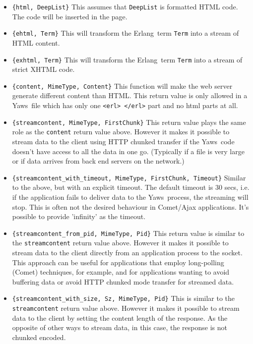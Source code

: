 \documentclass[11pt,oneside,english]{book}
\newcommand{\Erlang}            %
        {{\sc Erlang}}
\newcommand{\Yaws}            %
        {{\sc Yaws}}
\begin{document}
\begin{itemize}


\item \verb+{html, DeepList}+ This assumes that \verb+DeepList+ is
  formatted HTML code.  The code will be inserted in the page.

\item \verb+{ehtml, Term}+ This will transform the \Erlang\ term
  \verb+Term+ into a stream of HTML content.

\item \verb+{exhtml, Term}+ This will transform the \Erlang\ term
  \verb+Term+ into a stream of strict XHTML code.

\item \verb+{content, MimeType, Content}+ This function will make the
  web server generate different content than HTML. This return value
  is only allowed in a \Yaws\ file which has only one
  \verb+<erl> </erl>+ part and no html parts at all.

\item \verb+{streamcontent, MimeType, FirstChunk}+ This return value
  plays the same role as the \verb+content+ return value above.
  However it makes it possible to stream data to the client using HTTP
  chunked transfer if the \Yaws\ code doesn't have access to all the
  data in one go. (Typically if a file is very large or if data
  arrives from back end servers on the network.)

\item
  \verb+{streamcontent_with_timeout, MimeType, FirstChunk, Timeout}+
  Similar to the above, but with an explicit timeout. The default
  timeout is 30 secs, i.e. if the application fails to deliver data to
  the \Yaws\ process, the streaming will stop. This is often not the
  desired behaviour in Comet/Ajax applications. It's possible to
  provide 'infinity' as the timeout.

\item \verb+{streamcontent_from_pid, MimeType, Pid}+ This return value
  is similar to the \verb+streamcontent+ return value above.  However
  it makes it possible to stream data to the client directly from an
  application process to the socket. This approach can be useful for
  applications that employ long-polling (Comet) techniques, for
  example, and for applications wanting to avoid buffering data or
  avoid HTTP chunked mode transfer for streamed data.

\item \verb+{streamcontent_with_size, Sz, MimeType, Pid}+ This is
  similar to the \verb+streamcontent+ return value above. However it
  makes it possible to stream data to the client by setting the
  content length of the response. As the opposite of other ways to
  stream data, in this case, the response is not chunked encoded.



\end{itemize}
\end{document}
